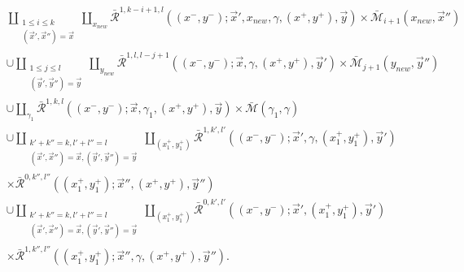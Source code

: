 \documentclass{amsart}
\numberwithin{equation}{section}
\numberwithin{figure}{section}
\begin{document}
\begin{equation} \label{boundary stratum of the moduli space defining the bimodule homomorphism}
\begin{split}
&\coprod_{\substack{1 \le i \le k\\ (\vec{x}', \vec{x}'') = \vec{x}}} \coprod_{x_{new}} \bar{\mathcal{R}}^{1, k-i+1, l}((x^{-}, y^{-}); \vec{x}', x_{new}, \gamma, (x^{+}, y^{+}), \vec{y}) \times \bar{\mathcal{M}}_{i+1}(x_{new}, \vec{x}'')\\
&\cup \coprod_{\substack{1 \le j \le l\\ (\vec{y}', \vec{y}'') = \vec{y}}} \coprod_{y_{new}} \bar{\mathcal{R}}^{1, l, l-j+1}((x^{-}, y^{-}); \vec{x}, \gamma, (x^{+}, y^{+}), \vec{y}') \times \bar{\mathcal{M}}_{j+1}(y_{new}, \vec{y}'')\\
&\cup \coprod_{\gamma_{1}} \bar{\mathcal{R}}^{1, k, l}((x^{-}, y^{-}); \vec{x}, \gamma_{1}, (x^{+}, y^{+}), \vec{y}) \times \bar{\mathcal{M}}(\gamma_{1}, \gamma)\\
&\cup \coprod_{\substack{k'+k''=k, l'+l''=l\\ (\vec{x}', \vec{x}'') = \vec{x}, (\vec{y}', \vec{y}'') = \vec{y}}} \coprod_{(x^{+}_{1}, y^{+}_{1})} \bar{\mathcal{R}}^{1, k', l'}((x^{-}, y^{-}); \vec{x}', \gamma, (x^{+}_{1}, y^{+}_{1}), \vec{y}')\\
&\times \bar{\mathcal{R}}^{0, k'', l''}((x^{+}_{1}, y^{+}_{1}); \vec{x}'', (x^{+}, y^{+}), \vec{y}'')\\
&\cup \coprod_{\substack{k'+k''=k, l'+l''=l\\ (\vec{x}', \vec{x}'') = \vec{x}, (\vec{y}', \vec{y}'') = \vec{y}}} \coprod_{(x^{+}_{1}, y^{+}_{1})} \bar{\mathcal{R}}^{0, k', l'}((x^{-}, y^{-}); \vec{x}', (x^{+}_{1}, y^{+}_{1}), \vec{y}')\\
&\times \bar{\mathcal{R}}^{1, k'', l''}((x^{+}_{1}, y^{+}_{1}); \vec{x}'', \gamma, (x^{+}, y^{+}), \vec{y}'').
\end{split}
\end{equation}\par
\end{document}
